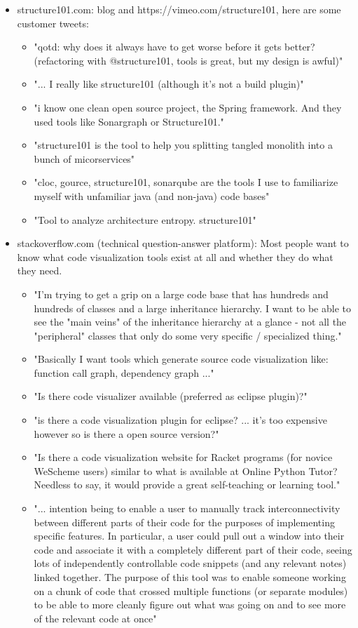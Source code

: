 \documentclass{article}
\begin{document}
\begin{itemize}
	\item structure101.com: blog and https://vimeo.com/structure101, here are some customer tweets:
	\begin{itemize}
		\item "qotd: why does it always have to get worse before it gets better? (refactoring with @structure101, tools is great, but my design is awful)"
		\item "... I really like structure101  (although it’s not a build plugin)"
		\item "i know one clean open source project, the Spring framework. And they used tools like Sonargraph or Structure101."
		\item "structure101 is the tool to help you splitting tangled monolith into a bunch of micorservices"
		\item "cloc, gource, structure101, sonarqube are the tools I use to familiarize myself with unfamiliar java (and non-java) code bases"
		\item "Tool to analyze architecture entropy. structure101"
	\end{itemize}
	\item stackoverflow.com (technical question-answer platform): Most people want to know what code visualization tools exist at all and whether they do what they need.
	\begin{itemize}
		\item "I'm trying to get a grip on a large code base that has hundreds and hundreds of classes and a large inheritance hierarchy. I want to be able to see the "main veins" of the inheritance hierarchy at a glance - not all the "peripheral" classes that only do some very specific / specialized thing."
		\item "Basically I want tools which generate source code visualization like: function call graph, dependency graph ..."
		\item "Is there code visualizer available (preferred as eclipse plugin)?"
		\item "is there a code visualization plugin for eclipse? ... it's too expensive however so is there a open source version?"
		\item "Is there a code visualization website for Racket programs (for novice WeScheme users) similar to what is available at Online Python Tutor? Needless to say, it would provide a great self-teaching or learning tool."
		\item "... intention being to enable a user to manually track interconnectivity between different parts of their code for the purposes of implementing specific features. In particular, a user could pull out a window into their code and associate it with a completely different part of their code, seeing lots of independently controllable code snippets (and any relevant notes) linked together. The purpose of this tool was to enable someone working on a chunk of code that crossed multiple functions (or separate modules) to be able to more cleanly figure out what was going on and to see more of the relevant code at once"

\end{itemize}
\end{itemize}
\end{document}
